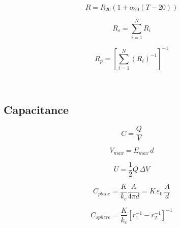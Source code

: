 \documentclass{form}
\begin{document}
\begin{minipage}[c]{0.19\textwidth}
	\begin{equation*}
		R=R_{20}(1+\alpha_{20}(T-20))
	\end{equation*}
\end{minipage}
\begin{minipage}[c]{0.11\textwidth}
	\begin{equation*}
		R_s = \sum_{i=1}^{N}{R_i}
	\end{equation*}
\end{minipage}
\begin{minipage}[c]{0.18\textwidth}
	\begin{equation*}
		R_p = \left[\sum_{i=1}^{N}{(R_i)^{-1}}\right]^{-1}
	\end{equation*}
\end{minipage} \\
\begin{minipage}[c]{0.15\textwidth}
	\subsection*{Capacitance}
\end{minipage}
\begin{minipage}[c]{0.06\textwidth}
	\begin{equation*}
		C=\frac{Q}{V}
	\end{equation*}
\end{minipage}
\begin{minipage}[c]{0.15\textwidth}
	\begin{equation*}
		V_{max} = E_{max}\,d
	\end{equation*}
\end{minipage}
\begin{minipage}[c]{0.10\textwidth}
	\begin{equation*}
		U=\frac{1}{2}Q\,\Delta V
	\end{equation*}
\end{minipage}
\begin{minipage}[c]{0.25\textwidth}
	\begin{equation*}
		C_{plane} = \frac{K}{k_e}\frac{A}{4\pi d} = K\,\varepsilon_0 \,\frac{A}{d}
	\end{equation*}
\end{minipage}
\begin{minipage}[c]{0.25\textwidth}
	\begin{equation*}
		C_{sphere} = \frac{K}{k_e}\left[r_1^{-1}-r_2^{-1}\right]^{-1}
	\end{equation*}
\end{minipage}
\end{document}
